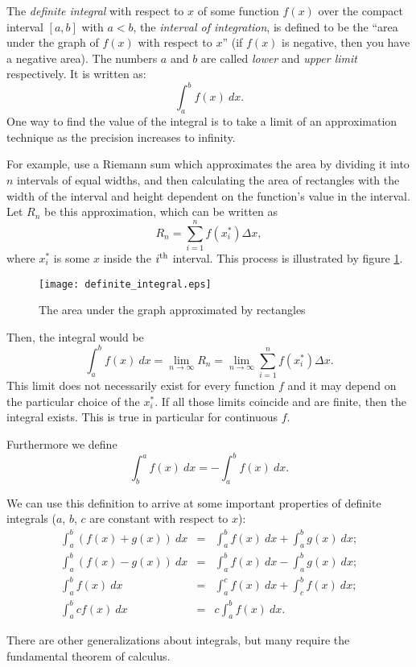 \documentclass[12pt]{article}
\begin{document}
The \emph{definite integral} with respect to $x$ of some function $f(x)$ over the compact interval $[a,b]$ with $a<b$, the \emph{interval of integration}, is
defined to be the ``area under the graph of $f(x)$ with respect to $x$'' (if $f(x)$ is negative, then you have a negative area). The numbers $a$ and $b$ are called \emph{lower} and \emph{upper limit} respectively. It is written as:
$$ \int_a^bf(x) \ dx .$$
One way to find the value of the integral is to take a limit of an approximation technique
as the precision increases to infinity.

For example, use a Riemann sum which approximates
the area by dividing it into $n$ intervals of equal widths, and then calculating the area
of rectangles with the width of the interval and height dependent on the function's value in the interval.
Let $R_n$ be this approximation, which can be written as
$$ R_n = \sum_{i=1}^{n} f(x_i^*) \Delta x ,$$
where $x_i^*$ is some $x$ inside the $i^{\rm th}$ interval. This process is illustrated by figure \ref{fig:bars}.
\begin{figure}[htbp]
\begin{centering}
\texttt{[image: definite\_integral.eps]}
\caption{The area under the graph approximated by rectangles}\label{fig:bars}
\end{centering}
\end{figure}

Then, the integral would be
$$ \int_a^bf(x) \ dx = \lim_{n \to \infty} R_n =
   \lim_{n \to \infty} \sum_{i=1}^{n} f(x_i^*) \Delta x .$$
This limit does not necessarily exist for every function $f$ and it may depend on the particular choice of the $x_i^*$.  If all those limits coincide and are finite, then the integral exists. This is true in particular for continuous $f$.

Furthermore we define
$$\int_b^af(x)\ dx=-\int_a^bf(x)\ dx.$$

We can use this definition to arrive at some important properties of definite integrals
($a$, $b$, $c$ are constant with respect to $x$):
\begin{eqnarray*}
\int_a^b(f(x) + g(x)) \ dx & = & \int_a^bf(x)\ dx + \int_a^bg(x)\ dx; \\
\int_a^b(f(x) - g(x)) \ dx & = & \int_a^bf(x)\ dx - \int_a^bg(x)\ dx ;\\
\int_a^bf(x) \ dx & = & \int_a^cf(x)\ dx + \int_c^bf(x)\ dx ;\\
\int_a^bcf(x) \ dx & = & c\int_a^bf(x)\ dx.
\end{eqnarray*}

There are other generalizations about integrals, but many require the fundamental theorem of calculus.

\end{document}
